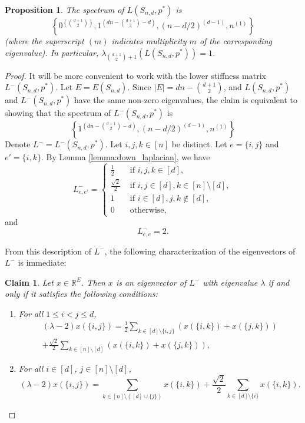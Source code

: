 \documentclass[a4paper,11pt]{article}
\theoremstyle{plain}
\newtheorem{claim}[theorem]{\bf Claim}
\newtheorem{proposition}[theorem]{\bf Proposition}
\theoremstyle{definition}
\newcommand{\Rea}{{\mathbb R}}
\newcommand{\px}{p^*}
\begin{document}
\begin{proposition}\label{claim:star_spectrum}
The spectrum of $L(S_{n,d},\px)$ is
\[
\left\{ 0^{\left(\binom{d+1}{2}\right)}, 1^{\left(dn-\binom{d+1}{2}-d\right)}, (n-d/2)^{(d-1)}, n^{(1)} \right\}
\]
(where the superscript $(m)$ indicates multiplicity $m$ of the corresponding eigenvalue).
In particular, $\lambda_{{\binom{d+1}{2}+1}}(L(S_{n,d},\px))= 1$.
\end{proposition}
\begin{proof}
It will be more convenient to work with the lower stiffness matrix $L^{-}(S_{n,d},\px)$. Let $E=E(S_{n,d})$. Since $|E|=d n-\binom{d+1}{2}$, and $L(S_{n,d},\px)$ and $L^{-}(S_{n,d},\px)$ have the same non-zero eigenvalues, the claim is equivalent to showing that the spectrum of $L^{-}(S_{n,d},\px)$ is
\[
\left\{ 1^{\left(dn-\binom{d+1}{2}-d\right)}, (n-d/2)^{(d-1)}, n^{(1)} \right\}
\]
Denote $L^{-}=L^{-}(S_{n,d},\px)$. Let $i,j,k\in [n]$ be distinct. Let $e=\{i,j\}$ and $e'=\{i,k\}$. By Lemma \ref{lemma:down_laplacian}, we have
\[
L^{-}_{e,e'}=
\begin{cases}
 \frac{1}{2} & \text{ if } i,j,k\in [d],\\
 \frac{\sqrt{2}}{2} & \text{ if } i,j\in[d], k\in[n]\setminus[d],\\
1 & \text{ if } i\in[d], j,k\notin[d],\\
0 & \text{ otherwise,}
\end{cases}
\]
and
\[
    L^{-}_{e,e}=2.
\]

From this description of $L^{-}$, the following characterization of the eigenvectors of $L^{-}$ is immediate:
\begin{claim}\label{claim:star_eigenvector_condition}
Let $x\in\Rea^E$. Then $x$ is an eigenvector of $L^{-}$ with eigenvalue $\lambda$ if and only if it satisfies the following conditions:
\begin{enumerate}
    \item For all $1\leq i<j\leq d$, 
    \begin{multline*}
    (\lambda-2)x(\{i,j\}) = \frac{1}{2}\sum_{k\in[d]\setminus\{i,j\}}(x(\{i,k\})+x(\{j,k\})) \\+\frac{\sqrt{2}}{2}\sum_{k\in[n]\setminus[d]}(x(\{i,k\})+x(\{j,k\})),
    \end{multline*}
    \item For all $i\in[d]$, $j\in[n]\setminus[d]$,
    \[
    (\lambda-2)x(\{i,j\}) = \sum_{k\in[n]\setminus([d]\cup\{j\})} x(\{i,k\}) +\frac{\sqrt{2}}{2}\sum_{k\in[d]\setminus\{i\}} x(\{i,k\}).
   \]
\end{enumerate}
\end{claim}



\end{proof}
\end{document}
